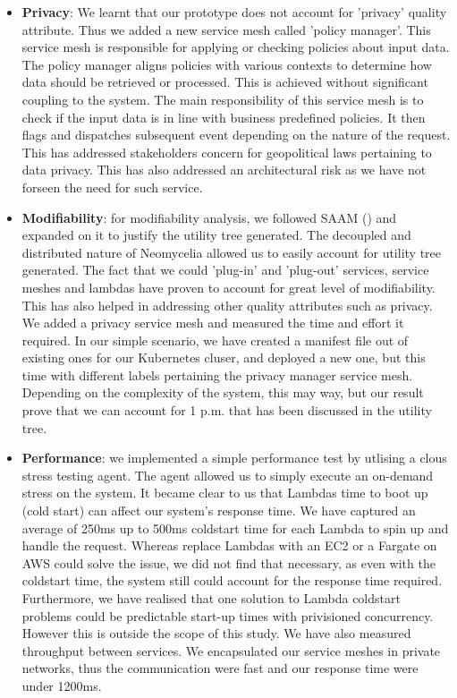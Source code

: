 \documentclass[conference]{IEEEtran}
\begin{document}
\begin{itemize}
    \item \textbf{Privacy}: We learnt that our prototype does not account for 'privacy' quality attribute. Thus we added a new service mesh called 'policy manager'. This service mesh is responsible for applying or checking policies about input data. The policy manager aligns policies with various contexts to determine how data should be retrieved or processed. This is achieved without significant coupling to the system. The main responsibility of this service mesh is to check if the input data is in line with business predefined policies. It then flags and dispatches subsequent event depending on the nature of the request. This has addressed stakeholders concern for geopolitical laws pertaining to data privacy. This has also addressed an architectural risk as we have not forseen the need for such service.
    \item \textbf{Modifiability}: for modifiability analysis, we followed SAAM (\cite{kazman1994saam}) and expanded on it to justify the utility tree generated. The decoupled and distributed nature of Neomycelia allowed us to easily account for utility tree generated. The fact that we could 'plug-in' and 'plug-out' services, service meshes and lambdas have proven to account for great level of modifiability. This has also helped in addressing other quality attributes such as privacy. We added a privacy service mesh and measured the time and effort it required. In our simple scenario, we have created a manifest file out of existing ones for our Kubernetes cluser, and deployed a new one, but this time with different labels pertaining the privacy manager service mesh. Depending on the complexity of the system, this may way, but our result prove that we can account for 1 p.m. that has been discussed in the utility tree.
    \item \textbf{Performance}: we implemented a simple performance test by utlising a clous stress testing agent. The agent allowed us to simply execute an on-demand stress on the system. It became clear to us that Lambdas time to boot up (cold start) can affect our system's response time. We have captured an average of 250ms up to 500ms coldstart time for each Lambda to spin up and handle the request. Whereas replace Lambdas with an EC2 or a Fargate on AWS could solve the issue, we did not find that necessary, as even with the coldstart time, the system still could account for the response time required. Furthermore, we have realised that one solution to Lambda coldstart problems could be predictable start-up times with privisioned concurrency. However this is outside the scope of this study. We have also measured throughput between services. We encapsulated our service meshes in private networks, thus the communication were fast and our response time were under 1200ms.
\end{itemize}
\end{document}
